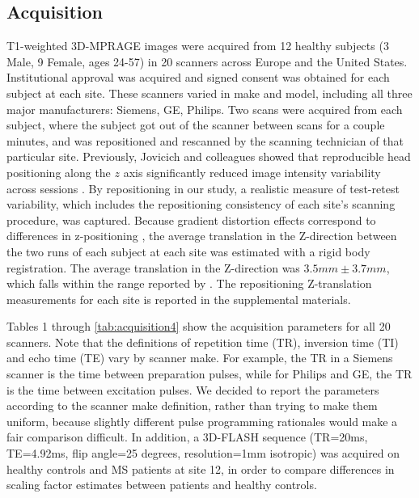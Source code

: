 \subsection{Acquisition}
T1-weighted 3D-MPRAGE images were acquired from 12 healthy subjects (3 Male, 9 Female, ages 24-57) in 20 scanners across Europe and the United States. Institutional approval was acquired and signed consent was obtained for each subject at each site. These scanners varied in make and model, including all three major manufacturers: Siemens, GE, Philips. Two scans were acquired from each subject, where the subject got out of the scanner between scans for a couple minutes, and was repositioned and rescanned by the scanning technician of that particular site. Previously, Jovicich and colleagues showed that reproducible head positioning along the $z$ axis significantly reduced image intensity variability across sessions \cite{freesurferReliability}. By repositioning in our study, a realistic measure of test-retest variability, which includes the repositioning consistency of each site's scanning procedure, was captured. Because gradient distortion effects correspond to differences in z-positioning \cite{caramanos2010gradient}, the average translation in the Z-direction between the two runs of each subject at each site was estimated with a rigid body registration. The average translation in the Z-direction was $3.5mm \pm 3.7mm$, which falls within the range reported by \cite{caramanos2010}. The repositioning Z-translation measurements for each site is reported in the supplemental materials.

Tables 1 through \ref{tab:acquisition4} show the acquisition parameters for all 20 scanners. Note that the definitions of repetition time (TR), inversion time (TI) and echo time (TE) vary by scanner make. For example, the TR in a Siemens scanner is the time between preparation pulses, while for Philips and GE, the TR is the time between excitation pulses. We decided to report the parameters according to the scanner make definition, rather than trying to make them uniform, because slightly different pulse programming rationales would make a fair comparison difficult. In addition, a 3D-FLASH sequence (TR=20ms, TE=4.92ms, flip angle=25 degrees, resolution=1mm isotropic) was acquired on healthy controls and MS patients at site 12, in order to compare differences in scaling factor estimates between patients and healthy controls. 